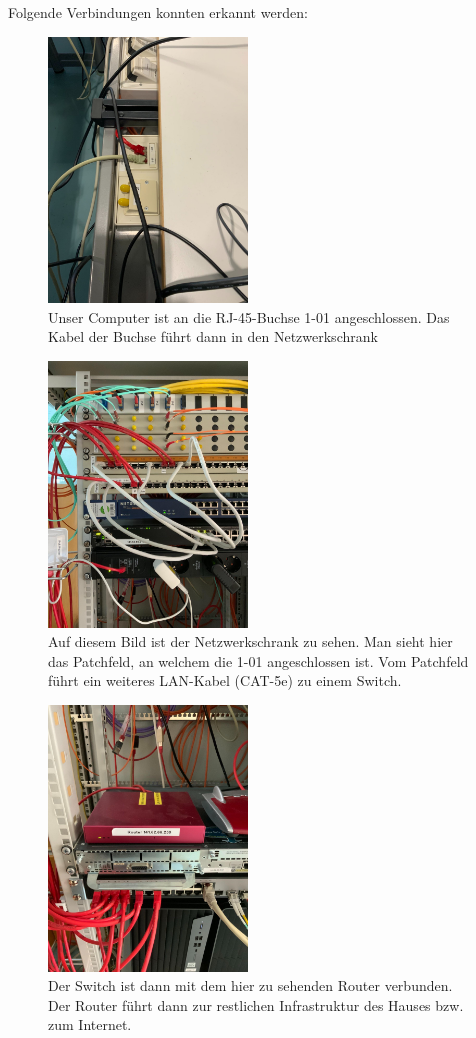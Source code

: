 Folgende Verbindungen konnten erkannt werden:

\begin{figure}
\centering
\includegraphics[width=2.08333in,height=\textheight]{./static/connector.jpeg}
\caption{Unser Computer ist an die RJ-45-Buchse 1-01 angeschlossen. Das
Kabel der Buchse führt dann in den Netzwerkschrank}
\end{figure}

\begin{figure}
\centering
\includegraphics[width=2.08333in,height=\textheight]{./static/full.jpeg}
\caption{Auf diesem Bild ist der Netzwerkschrank zu sehen. Man sieht
hier das Patchfeld, an welchem die 1-01 angeschlossen ist. Vom Patchfeld
führt ein weiteres LAN-Kabel (CAT-5e) zu einem Switch.}
\end{figure}

\begin{figure}
\centering
\includegraphics[width=2.08333in,height=\textheight]{./static/router.jpeg}
\caption{Der Switch ist dann mit dem hier zu sehenden Router verbunden.
Der Router führt dann zur restlichen Infrastruktur des Hauses bzw. zum
Internet.}
\end{figure}

